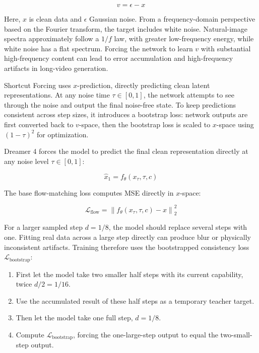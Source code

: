 \[
v=\epsilon-x
\]

Here, \(x\) is clean data and \(\epsilon\) Gaussian noise. From a frequency-domain perspective based on the Fourier transform, the target includes white noise. Natural-image spectra approximately follow a \(1/f\) law, with greater low-frequency energy, while white noise has a flat spectrum. Forcing the network to learn \(v\) with substantial high-frequency content can lead to error accumulation and high-frequency artifacts in long-video generation.

Shortcut Forcing uses \(x\)-prediction, directly predicting clean latent representations. At any noise time \(\tau\in[0,1]\), the network attempts to see through the noise and output the final noise-free state. To keep predictions consistent across step sizes, it introduces a bootstrap loss: network outputs are first converted back to \(v\)-space, then the bootstrap loss is scaled to \(x\)-space using \((1-\tau)^2\) for optimization.

Dreamer 4 forces the model to predict the final clean representation directly at any noise level \(\tau\in[0,1]\):

\[
\hat{x}_1=f_\theta(x_\tau,\tau,c)
\]

The base flow-matching loss computes MSE directly in \(x\)-space:

\[
\mathcal{L}_{\mathrm{flow}}=\left\|f_\theta(x_\tau,\tau,c)-x\right\|_2^2
\]

For a larger sampled step \(d=1/8\), the model should replace several steps with one. Fitting real data across a large step directly can produce blur or physically inconsistent artifacts. Training therefore uses the bootstrapped consistency loss \(\mathcal{L}_{\mathrm{bootstrap}}\):

\begin{enumerate}
\def\labelenumi{\arabic{enumi}.}
\tightlist
\item
  First let the model take two smaller half steps with its current capability, twice \(d/2=1/16\).
\item
  Use the accumulated result of these half steps as a temporary teacher target.
\item
  Then let the model take one full step, \(d=1/8\).
\item
  Compute \(\mathcal{L}_{\mathrm{bootstrap}}\), forcing the one-large-step output to equal the two-small-step output.
\end{enumerate}

